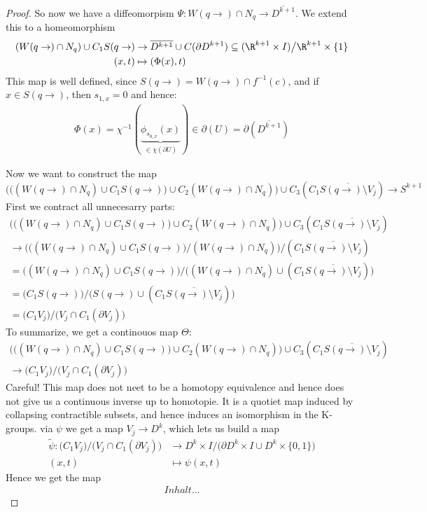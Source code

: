\begin{proof}
So now we have a diffeomorpism $\Psi:W(q\to)\cap N_q\to \overline{D^{k+1}}$. We extend this to a homeomorphism
\begin{align*}
	(W(q\to)\cap N_q)\cup C_1S(q\to)	& \to \overline{D^{k+1}}\cup C(\partial D^{k+1}) \subseteq (\R^{k+1}\times I)\big/ {\R^{k+1}\times \{1\}} \\
	(x,t)								& \mapsto (\Phi(x),t)	
\end{align*}
This map is well defined, since $S(q\to)=W(q\to)\cap f^{-1}(c)$, and  if $x\in S(q\to)$, then $ s_{1,x}=0$ and hence:
\begin{align*}
	\Phi(x) = \chi^{-1}(\underbrace{\phi_{s_{0,x}}(x)}_{\in \chi (\partial U)}) \in \partial (U)=\partial (\overline{D^{k+1}})
\end{align*}

Now we want to construct the map 
\begin{equation}
	\Bigg( \Big( (W(q\to )\cap N_q)\cup C_1 S(q\to)\Big)\cup C_2 (W(q\to )\cap N_q)\Bigg)\cup  C_3 (C_1 \overline{S(q\to)\setminus V_j}) \to S^{k+1}
\end{equation}
First we contract all unnecesarry parts: 
\begin{align*}
	\Bigg( \Big( (W(q\to )\cap N_q)\cup C_1 S(q\to)\Big)\cup C_2 (W(q\to )\cap N_q)\Bigg)\cup  C_3 (C_1 \overline{S(q\to)\setminus V_j}) \\
	\to \Bigg( \Big( (W(q\to )\cap N_q)\cup C_1 S(q\to)\Big) \Big/ (W(q\to )\cap N_q)\Bigg) \Big/ (C_1 \overline{S(q\to)\setminus V_j}) \\
	=   \Big( (W(q\to )\cap N_q)\cup C_1 S(q\to)\Big)         \Big/     
	    \Big( (W(q\to )\cap N_q) \cup (C_1 \overline{S(q\to)\setminus V_j}) \Big) \\
	= \Big( C_1 S(q\to)  \Big)  \big/   \big( S(q\to ) \cup (C_1 \overline{S(q\to)\setminus V_j}) \big)\\
	= \big( C_1 V_j \big)\big/ \big( V_j \cap C_1(\partial V_j)\big) 
\end{align*}
To summarize, we get a continouos map $\Theta$: 
\begin{align*}
	\Bigg( \Big( (W(q\to )\cap N_q)\cup C_1 S(q\to)\Big)\cup C_2 (W(q\to )\cap N_q)\Bigg)\cup  C_3 (C_1 \overline{S(q\to)\setminus V_j}) \\ 
	\to \big( C_1 V_j \big)\big/ \big( V_j \cap C_1(\partial V_j)\big) 
\end{align*}
Careful! This map does not neet to be a homotopy equivalence and hence does not give us a continuous inverse up to homotopie. It is a quotiet map induced by collapsing contractible subsets, and hence induces an isomorphism in the K-groups. 
via $\psi$ we get a map $V_j\to D^k$, which lets us build a map 
\begin{align*}
	\tilde{\psi}: \big( C_1 V_j \big)\big/ \big( V_j \cap C_1(\partial V_j)\big)  &\to D^k\times I \big/ \big(\partial D^k\times I\cup D^k\times \{0,1\} \big)\\
	(x,t)					&\mapsto \psi(x,t)
\end{align*}
Hence we get the map 
\begin{align*}
	Inhalt...
\end{align*}

 \end{proof}

